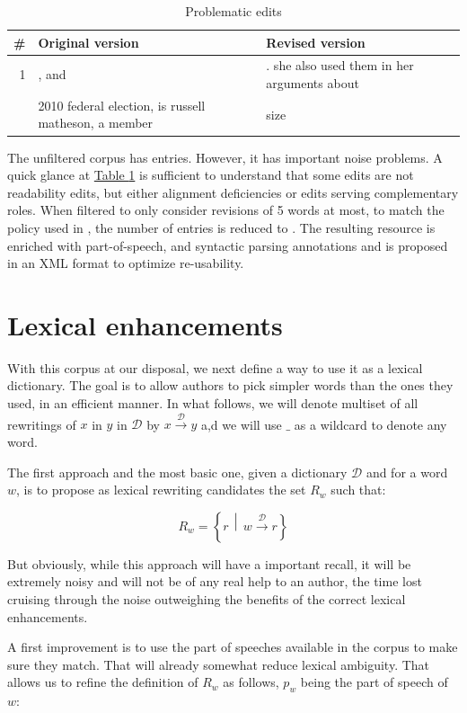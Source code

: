 \documentclass[a4paper, 11pt, onepage]{scrreprt}
\newcommand\tableref[1]{\hyperref[#1]{Table \ref*{#1}}}
\newcommand\maps[1]{\xrightarrow{\mathcal{#1}}}
\newcommand\suchthat{\, \middle| \,}
\begin{document}
\begin{table}[H]
  \centering
  \caption{Problematic edits}
  \begin{tabular}{rp{6cm}p{6cm}}
    \toprule
    \# & Original version & Revised version \\
    \midrule
    1 & , and & . she also used them in her arguments about \\
    \addlinespace
    2 & 2010 federal election, is russell matheson, a member & size\\
  \end{tabular}
  \label{tab:problematic-edits}
\end{table}

The unfiltered corpus has  entries. However, it has
important noise problems. A quick glance at
\tableref{tab:problematic-edits} is sufficient to understand that some
edits are not readability edits, but either alignment deficiencies or
edits serving complementary roles. When filtered to only consider
revisions of 5 words at most, to match the policy used in
\cite{yatskar2010sake}, the number of entries is reduced to
.  The resulting resource is enriched with
part-of-speech, and syntactic parsing annotations and is proposed in
an XML format to optimize re-usability.

\section{Lexical enhancements}
\label{sec:lexical-enhancements}

With this corpus at our disposal, we next define a way to use it as a
lexical dictionary. The goal is to allow authors to pick simpler words
than the ones they used, in an efficient manner. In what follows, we
will denote multiset of all rewritings of $x$ in $y$ in $\mathcal{D}$
by $x \maps{D} y$ a,d we will use $\_$ as a wildcard to denote any
word.

The first approach and the most basic one, given a dictionary
$\mathcal{D}$ and for a word $w$, is to propose as lexical rewriting
candidates the set $R_w$ such that:

\[
R_w = \left\{r \suchthat w \maps{D} r\right\}
\]

But obviously, while this approach will have a important recall, it
will be extremely noisy and will not be of any real help to an author,
the time lost cruising through the noise outweighing the benefits of
the correct lexical enhancements.

A first improvement is to use the part of speeches available in the
corpus to make sure they match. That will already somewhat reduce
lexical ambiguity. That allows us to refine the definition of $R_w$ as
follows, $p_w$ being the part of speech of $w$:
\end{document}
